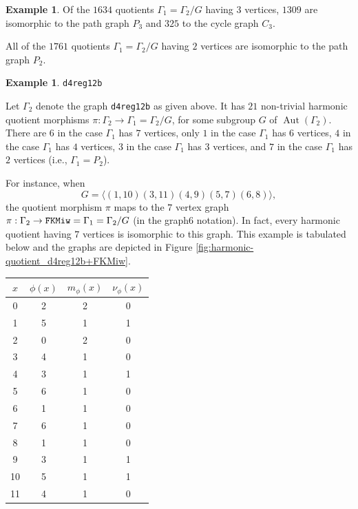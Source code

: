 \documentclass[12pt,letterpaper]{article}
\theoremstyle{definition}
\newtheorem{example}[theorem]{Example}
\DeclareMathOperator{\Aut}{Aut}
\begin{document}
\begin{example}
{Of the $1634$ quotients $\Gamma_1=\Gamma_2/G$ having $3$ vertices,
$1309$ are isomorphic to the path graph $P_3$ and $325$ to the cycle graph $C_3$.

All of the $1761$ quotients $\Gamma_1=\Gamma_2/G$ having $2$ vertices
are isomorphic to the path graph $P_2$.
}
\end{example}



\begin{example}%
\label{example:d4reg12b}
 {\tt d4reg12b}\newline
{\rm  
  Let $\Gamma_2$ denote the graph {\tt d4reg12b} as given above.
It has $21$  non-trivial harmonic quotient morphisms
$\pi: \Gamma_2\to \Gamma_1=\Gamma_2/G$,
for some subgroup $G$ of $\Aut(\Gamma_2)$.
There are $6$ in the case $\Gamma_1$ has $7$ vertices,
only $1$ in the case $\Gamma_1$ has $6$ vertices,
$4$ in the case $\Gamma_1$ has $4$ vertices,
$3$ in the case $\Gamma_1$ has $3$ vertices,
and  $7$ in the case $\Gamma_1$ has $2$ vertices
(i.e., $\Gamma_1=P_2$).


For instance, when
\[
G = \langle (1,10)(3,11)(4,9)(5,7)(6,8) \rangle ,
\]
the quotient morphism $\pi$ maps to the $7$ vertex graph
$\pi: \Gamma_2\to {\tt FKMiw}=\Gamma_1=\Gamma_2/G $ (in the graph6 notation).
In fact, every harmonic quotient having $7$ vertices is isomorphic to
this graph. This example
is tabulated below and the graphs are depicted in
Figure \ref{fig:harmonic-quotient_d4reg12b+FKMiw}. 

\begin{center}
\begin{tabular}{c|c|c|c}  
  $x$ & $\phi(x)$ & $m_\phi(x)$ & $\nu_\phi(x)$ \\ \hline
  0   &    2   &        2         &  0   \\ 
  1   &    5   &        1         &  1  \\ 
  2   &    0   &        2         &  0  \\ 
  3   &    4   &        1         &  0  \\ 
  4   &    3   &        1         &  1   \\
  5   &    6   &        1         &  0   \\
  6   &    1   &        1         &  0   \\
  7   &    6   &        1         &  0   \\
  8   &    1   &        1         &  0   \\
  9   &    3   &        1         &  1   \\
  10   &   5   &        1         &  1  \\   
  11   &   4   &        1         &  0  \\
\end{tabular}
\end{center}

}
\end{example}
\end{document}
